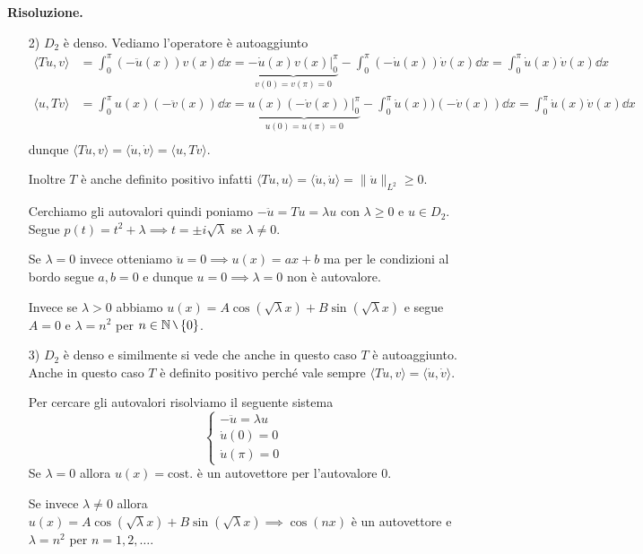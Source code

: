 \textbf{Risoluzione.}
\begin{enumerate}
	\item[2)] $D_2$ è denso. Vediamo l'operatore è autoaggiunto
		$$
		\begin{aligned}
			\langle Tu, v \rangle 
			&= \int_0^\pi (-\ddot u(x)) v(x) \dd x 
			= \underbrace{-\dot u(x) v(x) \bigg|_0^\pi}_{v(0) = v(\pi) = 0} - \int_0^\pi (-\dot u(x)) \dot v(x) \dd x 
			= \int_0^\pi \dot u(x) \dot v(x) \dd x \\
			\langle u, Tv \rangle 
			&= \int_0^\pi u(x) (-\ddot v(x)) \dd x 
			= \underbrace{u(x) (-\dot v(x)) \bigg|_0^\pi}_{u(0) = u(\pi) = 0} - \int_0^\pi \dot u(x)) (-\dot v(x)) \dd x 
			= \int_0^\pi \dot u(x) \dot v(x) \dd x \\
		\end{aligned}
		$$
		dunque $\langle Tu, v \rangle = \langle \dot u, \dot v \rangle = \langle u, Tv \rangle$.

		Inoltre $T$ è anche definito positivo infatti $\langle T u, u \rangle = \langle \dot u, \dot u \rangle = \| \dot u \|_{L^2} \geq 0$.

		Cerchiamo gli autovalori quindi poniamo $-\ddot u = Tu = \lambda u$ con $\lambda \geq 0$ e $u \in D_2$. Segue $p(t) = t^2 + \lambda \implies t = \pm i \sqrt{\lambda}$ se $\lambda \neq 0$. 

		Se $\lambda = 0$ invece otteniamo $\ddot u = 0 \implies u(x) = a x + b$ ma per le condizioni al bordo segue $a, b = 0$ e dunque $u = 0 \implies \lambda = 0$ non è autovalore.

		Invece se $\lambda > 0$ abbiamo $u(x) = A \cos(\sqrt{\lambda} x) + B \sin(\sqrt{\lambda} x)$ e segue $A = 0$ e $\lambda = n^2$ per $n \in \N \setminus \{ 0 \}$.

	\item[3)] $D_2$ è denso e similmente si vede che anche in questo caso $T$ è autoaggiunto. Anche in questo caso $T$ è definito positivo perché vale sempre $\langle Tu, v \rangle = \langle \dot u, \dot v \rangle$.

		Per cercare gli autovalori risolviamo il seguente sistema
		$$
		\begin{cases}
			-\ddot u = \lambda u \\
			\dot u(0) = 0 \\
			\dot u(\pi) = 0
		\end{cases}
		$$
		Se $\lambda = 0$ allora $u(x) = \text{cost.}$ è un autovettore per l'autovalore $0$.

		Se invece $\lambda \neq 0$ allora $u(x) = A \cos(\sqrt{\lambda} x) + B \sin(\sqrt{\lambda} x) \implies \cos(nx)$ è un autovettore e $\lambda = n^2$ per $n = 1, 2, \dots$.


\end{enumerate}
